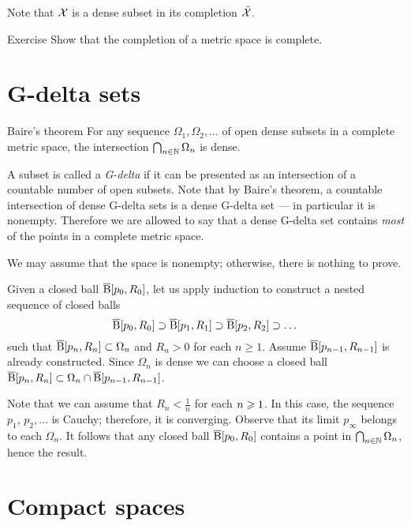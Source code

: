 Note that $\mathcal{X}$ is a dense subset in its completion $\bar{\mathcal{X}}$.

\begin{thm}{Exercise}\label{ex:complete-completion}
Show that the completion of a metric space is complete.
\end{thm} 

\section{G-delta sets}\label{sec:G-delta}

\begin{thm}{Baire's theorem}\label{thm:baire}
For any sequence $\Omega_1,\Omega_2,\dots$ of open dense subsets in a complete metric space, the intersection $\bigcap_{n\in \mathbb{N}}\Omega_n$ is dense.
\end{thm}

A subset is called a \emph{G-delta} if it can be presented as an intersection of a countable number of open subsets.
Note that by Baire's theorem, a countable intersection of dense G-delta sets is a dense G-delta set --- in particular it is nonempty.
Therefore we are allowed to say that a dense G-delta set contains \textit{most} of the points in a complete metric space.

We may assume that the space is nonempty; otherwise, there is nothing to prove.

Given a  closed ball $\overline{\mathrm{B}}{}[p_0,R_0]$,
let us apply induction to construct a nested sequence of closed balls
\[\overline{\mathrm{B}}{}[p_0,R_0]\supset\overline{\mathrm{B}}{}[p_1,R_1]\supset \overline{\mathrm{B}}{}[p_2,R_2]\supset\dots\]
such that $\overline{\mathrm{B}}{}[p_n,R_n]\subset \Omega_n$ and $R_n>0$ for each $n\ge 1$. 
Assume $\overline{\mathrm{B}}{}[p_{n-1},R_{n-1}]$ is already constructed.
Since $\Omega_n$ is dense we can choose a closed ball 
$\overline{\mathrm{B}}{}[p_n,R_n]\subset\Omega_n\cap \overline{\mathrm{B}}{}[p_{n-1},R_{n-1}]$.

Note that we can assume that $R_n<\tfrac1{n}$ for each $n\z\ge 1$.
In this case, the sequence $p_1$, $p_2,\dots$ is Cauchy; therefore, it is converging.
Observe that its limit $p_\infty$ belongs to each $\Omega_n$.
It follows that any closed ball $\overline{\mathrm{B}}{}[p_0,R_0]$ contains a point in $\bigcap_{n\in \mathbb{N}}\Omega_n$, hence the result.
\qeds
 





\section{Compact spaces}

